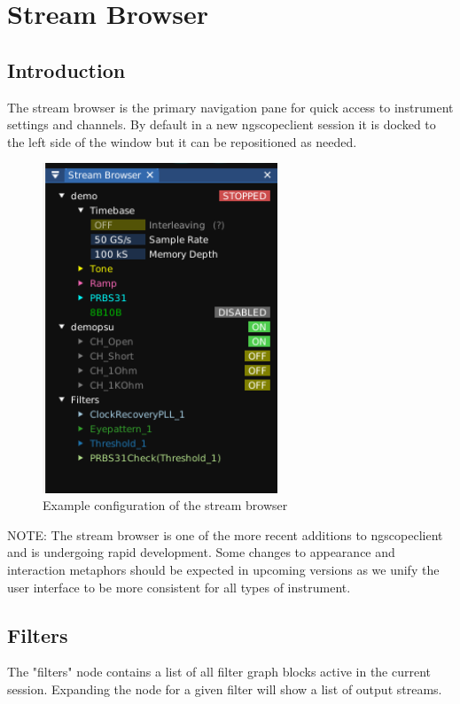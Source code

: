 \chapter{Stream Browser}
\label{streambrowser}

\section{Introduction}

The stream browser is the primary navigation pane for quick access to instrument settings and channels. By default in a
new ngscopeclient session it is docked to the left side of the window but it can be repositioned as needed.

\begin{figure}[H]
\centering
\includegraphics[width=7cm]{ng-images/streambrowser.png}
\caption{Example configuration of the stream browser}
\label{streambrowser}
\end{figure}

NOTE: The stream browser is one of the more recent additions to ngscopeclient and is undergoing rapid development. Some
changes to appearance and interaction metaphors should be expected in upcoming versions as we unify the user interface
to be more consistent for all types of instrument.

\section{Filters}

The "filters" node contains a list of all filter graph blocks active in the current session. Expanding the node for a
given filter will show a list of output streams.

